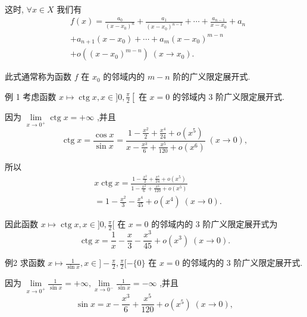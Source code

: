 这时, $\forall x \in  X$ 我们有
\begin{align*}
	&f\left( x\right)  = \frac{{a}_{0}}{{\left( x - {x}_{0}\right) }^{n}} + \frac{{a}_{1}}{{\left( x - {x}_{0}\right) }^{n - 1}} + \cdots  + \frac{{a}_{n - 1}}{x - {x}_{0}} + {a}_{n}\\
	&+ {a}_{n + 1}\left( {x - {x}_{0}}\right)  + \cdots  + {a}_{m}{\left( x - {x}_{0}\right) }^{m - n}\\
	&+ o\left( {\left( x - {x}_{0}\right) }^{m - n}\right) \;\left( {x \rightarrow  {x}_{0}}\right) .
\end{align*}

此式通常称为函数 $f$ 在 ${x}_{0}$ 的邻域内的 $m - n$ 阶的广义限定展开式.

例 1 考虑函数 $x \mapsto  \operatorname{ctg}x,x \in  \rbrack 0,\frac{\pi }{2}\left\lbrack  \right.$ 在 $x = 0$ 的邻域内 3 阶广义限定展开式.

因为 $\mathop{\lim }\limits_{{x \rightarrow  {0}^{ + }}}\operatorname{ctg}x =  + \infty$ ,并且
$$\operatorname{ctg}x = \frac{\cos x}{\sin x} = \frac{1 - \frac{{x}^{2}}{2} + \frac{{x}^{4}}{24} + o\left( {x}^{5}\right) }{x - \frac{{x}^{3}}{6} + \frac{{x}^{5}}{120} + o\left( {x}^{6}\right) }\;\left( {x \rightarrow  0}\right) ,$$

所以
\begin{align*}
	&x\operatorname{ctg}x = \frac{1 - \frac{{x}^{2}}{2} + \frac{{x}^{4}}{24} + o\left( {x}^{5}\right) }{1 - \frac{{x}^{2}}{6} + \frac{{x}^{4}}{120} + o\left( {x}^{5}\right) }\\
	&= 1 - \frac{{x}^{2}}{3} - \frac{{x}^{4}}{45} + o\left( {x}^{4}\right) \;\left( {x \rightarrow  0}\right) .
\end{align*}

因此函数 $x \mapsto  \operatorname{ctg}x,x \in  \rbrack 0,\frac{\pi }{2}\lbrack$ 在 $x = 0$ 的邻域内的 3 阶广义限定展开式为
$$\operatorname{ctg}x = \frac{1}{x} - \frac{x}{3} - \frac{{x}^{3}}{45} + o\left( {x}^{3}\right) \;\left( {x \rightarrow  0}\right) .$$

例2 求函数 $x \mapsto  \frac{1}{\sin x},x \in  \rbrack  - \frac{\pi }{2},\frac{\pi }{2}\lbrack  - \{ 0\}$ 在 $x = 0$ 的邻域内的 3 阶广义限定展开式.

因为 $\mathop{\lim }\limits_{{x \rightarrow  {0}^{ + }}}\frac{1}{\sin x} =  + \infty ,\mathop{\lim }\limits_{{x \rightarrow  {0}^{ - }}}\frac{1}{\sin x} =  - \infty$ ,并且
$$\sin x = x - \frac{{x}^{3}}{6} + \frac{{x}^{5}}{120} + o\left( {x}^{5}\right) \;\left( {x \rightarrow  0}\right) ,$$

